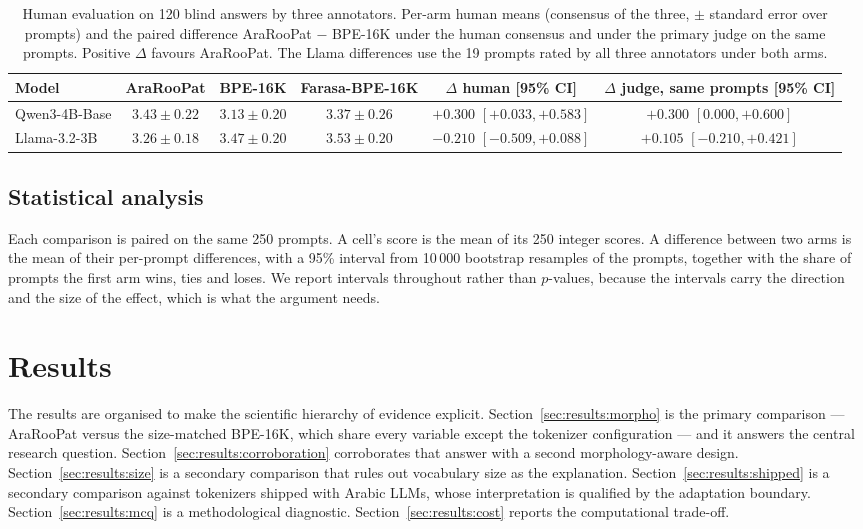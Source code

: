 \documentclass[a4paper,fleqn]{cas-sc}
\begin{document}
\begin{table}[t]
\centering
\caption{Human evaluation on 120 blind answers by three annotators. Per-arm human means (consensus of the three, $\pm$ standard error over prompts) and the paired difference AraRooPat $-$ BPE-16K under the human consensus and under the primary judge on the same prompts. Positive $\Delta$ favours AraRooPat. The Llama differences use the 19 prompts rated by all three annotators under both arms.}
\label{tab:human}
\begin{tabular}{@{}lccccc@{}}
\toprule
Model & AraRooPat & BPE-16K & Farasa-BPE-16K & $\Delta$ human [95\% CI] & $\Delta$ judge, same prompts [95\% CI] \\
\midrule
Qwen3-4B-Base & $3.43 \pm 0.22$ & $3.13 \pm 0.20$ & $3.37 \pm 0.26$ & $+0.300$ $[+0.033,+0.583]$ & $+0.300$ $[0.000,+0.600]$ \\
Llama-3.2-3B & $3.26 \pm 0.18$ & $3.47 \pm 0.20$ & $3.53 \pm 0.20$ & $-0.210$ $[-0.509,+0.088]$ & $+0.105$ $[-0.210,+0.421]$ \\
\bottomrule
\end{tabular}
\end{table}

\subsection{Statistical analysis}
\label{sec:protocol:stats}

Each comparison is paired on the same 250 prompts. A cell's score is the mean of its 250 integer scores. A difference between two arms is the mean of their per-prompt differences, with a 95\% interval from 10\,000 bootstrap resamples of the prompts, together with the share of prompts the first arm wins, ties and loses. We report intervals throughout rather than $p$-values, because the intervals carry the direction and the size of the effect, which is what the argument needs.

\section{Results}
\label{sec:results}

The results are organised to make the scientific hierarchy of evidence explicit. Section~\ref{sec:results:morpho} is the primary comparison --- AraRooPat versus the size-matched BPE-16K, which share every variable except the tokenizer configuration --- and it answers the central research question. Section~\ref{sec:results:corroboration} corroborates that answer with a second morphology-aware design. Section~\ref{sec:results:size} is a secondary comparison that rules out vocabulary size as the explanation. Section~\ref{sec:results:shipped} is a secondary comparison against tokenizers shipped with Arabic LLMs, whose interpretation is qualified by the adaptation boundary. Section~\ref{sec:results:mcq} is a methodological diagnostic. Section~\ref{sec:results:cost} reports the computational trade-off.
\end{document}
